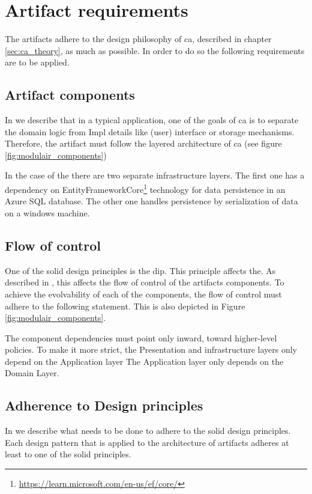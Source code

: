 \section{Artifact requirements} \label{sec:artifact_requirements}

The artifacts adhere to the design philosophy of \gls{ca}, described in chapter
\ref{sec:ca_theory}, as much as possible. In order to do so the following
requirements are to be applied.

\subsection{Artifact components}
In  we describe that in a typical application, one of the goals of
\gls{ca} is to separate the domain logic from Impl details like (user) interface
or storage mechanisms. Therefore, the artifact must follow the layered architecture of
\gls{ca} (see figure \ref{fig:modulair_components})

In the case of the  there are two separate infrastructure
layers. The first one has a dependency on
EntityFrameworkCore\footnote{\url{https://learn.microsoft.com/en-us/ef/core/}} technology
for data persistence in an Azure SQL database. The other one handles persistence by
serialization of data on a windows machine.

\subsection{Flow of control}
One of the \gls{solid} design principles is the \acrfull{dip}. This principle affects the.
As described in , this affects the flow of control of the
artifacts components. To achieve the evolvability of each of the components, the flow of
control must adhere to the following statement. This is also depicted in Figure
\ref{fig:modulair_components}.

The component dependencies must point only inward, toward higher-level policies. To make
it more strict, the Presentation and infrastructure layers only depend on the Application
layer The Application layer only depends on the  Domain Layer.

\subsection{Adherence to Design principles}
In  we describe what needs to be done to adhere to the
\gls{solid} design principles. Each design pattern that is applied to the architecture of
artifacts adheres at least to one of the \gls{solid} principles.

